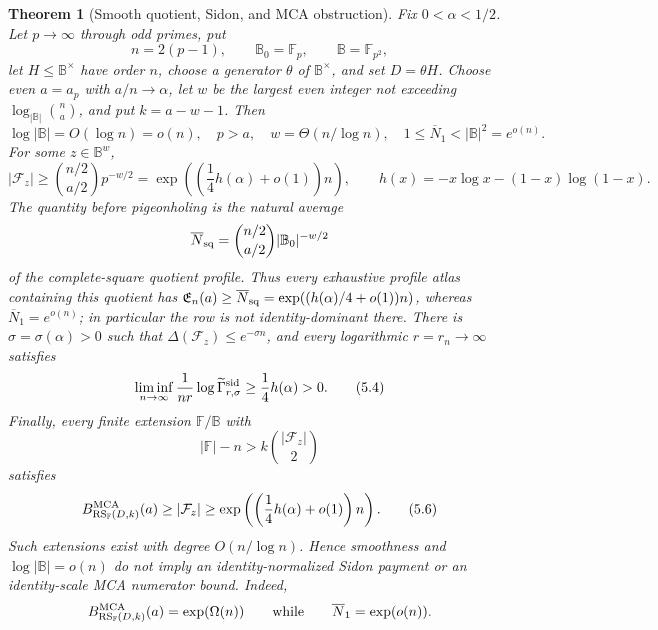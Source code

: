\documentclass[11pt,a4paper]{amsart}
\numberwithin{equation}{section}
\newtheorem{theorem}{Theorem}[section]
\theoremstyle{remark}
\DeclareMathOperator{\RS}{RS}
\newcommand{\F}{\mathbb F}
\newcommand{\B}{\mathbb B}
\newcommand{\Gsid}{\Gamma^{\rm sid}}
\newcommand{\barN}{\overline N}
\newcommand{\Eprof}{\mathfrak E}
\begin{document}
\begin{theorem}[Smooth quotient, Sidon, and MCA obstruction]
\label{thm:polynomial-obstruction}
Fix \(0<\alpha<1/2\).  Let \(p\to\infty\) through odd primes, put
\[
 n=2(p-1),\qquad \B_0=\F_p,\qquad \B=\F_{p^2},
\]
let \(H\le\B^\times\) have order \(n\), choose a generator \(\theta\) of
\(\B^\times\), and set \(D=\theta H\).  Choose even \(a=a_p\) with
\(a/n\to\alpha\), let \(w\) be the largest even integer not exceeding
\(\log_{|\B|}\binom na\), and put \(k=a-w-1\).  Then
\[
 \log|\B|=O(\log n)=o(n),\quad p>a,\quad
 w=\Theta(n/\log n),\quad 1\le\barN_1<|\B|^2=e^{o(n)}.
 \tag{5.2}\label{eq:counterexample-scale}
\]
For some \(z\in\B^w\),
\[
 |\mathcal F_z|\ge \binom{n/2}{a/2}p^{-w/2}
 =\exp\left(\left(\frac14h(\alpha)+o(1)\right)n\right),
 \qquad h(x)=-x\log x-(1-x)\log(1-x).
 \tag{5.3}\label{eq:counterexample-fiber}
\]
The quantity before pigeonholing is the natural average
\[
 \barN_{\rm sq}=\binom{n/2}{a/2}|\B_0|^{-w/2}
\]
of the complete-square quotient profile.  Thus every exhaustive profile
atlas containing this quotient has
\(\Eprof_n(a)\ge\barN_{\rm sq}
=\exp((h(\alpha)/4+o(1))n)\), whereas
\(\barN_1=e^{o(n)}\); in particular the row is not identity-dominant
there.
There is \(\sigma=\sigma(\alpha)>0\) such that
\(\Delta(\mathcal F_z)\le e^{-\sigma n}\), and every logarithmic
\(r=r_n\to\infty\) satisfies
\[
 \liminf_{n\to\infty}\frac1{nr}
       \log\widetilde\Gsid_{r,\sigma}
 \ge\frac14h(\alpha)>0.
 \tag{5.4}\label{eq:counterexample-sidon}
\]
Finally, every finite extension \(\F/\B\) with
\[
 |\F|-n>k\binom{|\mathcal F_z|}{2}
 \tag{5.5}\label{eq:counterexample-extension}
\]
satisfies
\[
 B_{\RS_\F(D,k)}^{\rm MCA}(a)\ge|\mathcal F_z|
 \ge\exp\left(\left(\frac14h(\alpha)+o(1)\right)n\right).
 \tag{5.6}\label{eq:counterexample-mca}
\]
Such extensions exist with degree \(O(n/\log n)\).  Hence smoothness and
\(\log|\B|=o(n)\) do not imply an identity-normalized Sidon payment or an
identity-scale MCA numerator bound.  Indeed,
\[
        B_{\RS_\F(D,k)}^{\rm MCA}(a)=\exp(\Omega(n))
        \qquad\text{while}\qquad
        \barN_1=\exp(o(n)).
\]
\end{theorem}
\end{document}
